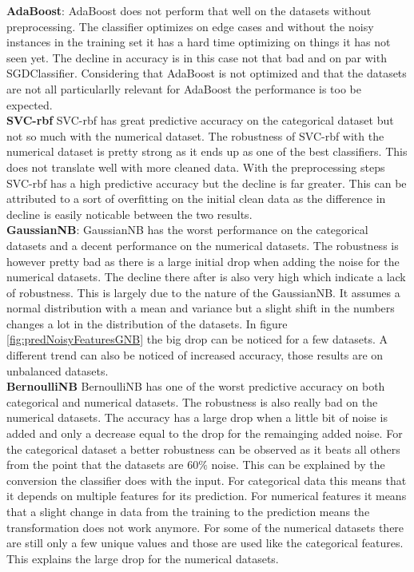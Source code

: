 \documentclass[a4paper,10pt]{article}
\begin{document}
\textbf{AdaBoost}: AdaBoost does not perform that well on the datasets without preprocessing. The classifier optimizes on edge cases and without the noisy instances in the training set it has a hard time optimizing on things it has not seen yet. The decline in accuracy is in this case not that bad and on par with SGDClassifier. Considering that AdaBoost is not optimized and that the datasets are not all particularlly relevant for AdaBoost the performance is too be expected.\\

\textbf{SVC-rbf} SVC-rbf has great predictive accuracy on the categorical dataset but not so much with the numerical dataset. The robustness of SVC-rbf with the numerical dataset is pretty strong as it ends up as one of the best classifiers. This does not translate well with more cleaned data. With the preprocessing steps SVC-rbf has a high predictive accuracy but the decline is far greater. This can be attributed to a sort of overfitting on the initial clean data as the difference in decline is easily noticable between the two results. \\

\textbf{GaussianNB}: GaussianNB has the worst performance on the categorical datasets and a decent performance on the numerical datasets. The robustness is however pretty bad as there is a large initial drop when adding the noise for the numerical datasets. The decline there after is also very high which indicate a lack of robustness. This is largely due to the nature of the GaussianNB. It assumes a normal distribution with a mean and variance but a slight shift in the numbers changes a lot in the distribution of the datasets. In figure \ref{fig:predNoisyFeaturesGNB} the big drop can be noticed for a few datasets. A different trend can also be noticed of increased accuracy, those results are on unbalanced datasets. \\

\textbf{BernoulliNB} BernoulliNB has one of the worst predictive accuracy on both categorical and numerical datasets. The robustness is also really  bad on the numerical datasets. The accuracy has a large drop when a little bit of noise is added and only a decrease equal to the drop for the remainging added noise. For the categorical dataset a better robustness can be observed as it beats all others from the point that the datasets are 60$\%$ noise. This can be explained by the conversion the classifier does with the input. For categorical data this means that it depends on multiple features for its prediction. For numerical features it means that a slight change in data from the training to the prediction means the transformation does not work anymore. For some of the numerical datasets there are still only a few unique values and those are used like the categorical features. This explains the large drop for the numerical datasets.  \\
\end{document}

